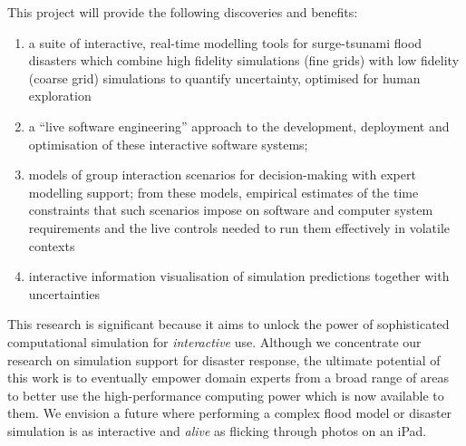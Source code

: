 This project will provide the following discoveries and benefits:
\begin{enumerate}

\item a suite of interactive, real-time modelling tools for
  surge-tsunami flood disasters which combine high fidelity
  simulations (fine grids) with low fidelity (coarse grid) simulations
  to quantify uncertainty, optimised for human exploration

\item a ``live software engineering'' approach to the development,
  deployment and optimisation of these interactive software systems;

\item models of group interaction scenarios for decision-making with
  expert modelling support; from these models, empirical estimates of
  the time constraints that such scenarios impose on software
  and computer system requirements and the live controls needed to run
  them effectively in volatile contexts

\item interactive information visualisation of simulation predictions
together with uncertainties
 

\end{enumerate}

This research is significant because it aims to unlock the power of
sophisticated computational simulation for \emph{interactive} use.
Although we concentrate our research on simulation support for
disaster response, the ultimate potential of this work is to
eventually empower domain experts from a broad range of areas to
better use the high-performance computing power which is now available
to them. We envision a future where performing a complex flood model
or disaster simulation is as interactive and \emph{alive} as flicking
through photos on an iPad.

